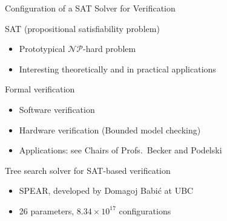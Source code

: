 \begin{frame}[c,fragile]{Configuration of a SAT Solver for Verification}

\begin{block}{SAT (propositional satisfiability problem)}
        \begin{itemize}
                \item Prototypical $\mathcal{NP}$-hard problem
                \item Interesting theoretically and in practical applications
        \end{itemize}
\end{block}
        
\pause

\begin{block}{Formal verification}
        \begin{itemize}
                \item Software verification\\%
                \item Hardware verification (Bounded model checking) %
                \item Applications: see Chairs of Profs.\ Becker and Podelski
        \end{itemize}
\end{block}

\pause

\begin{block}{Tree search solver for SAT-based verification}
        \begin{itemize}
                \item SPEAR, developed by Domagoj Babi\'c at UBC
                \item 26 parameters, $8.34 \times 10^{17}$ configurations\\
        \end{itemize}
\end{block}

\end{frame}




